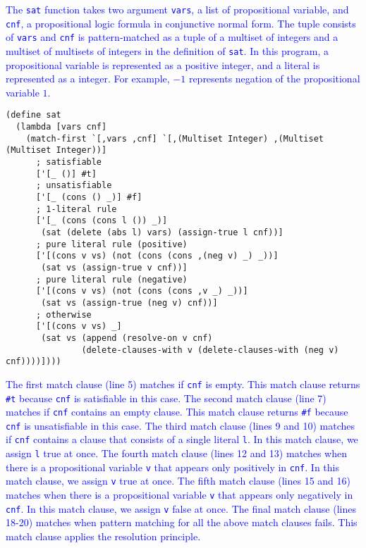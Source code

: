 \documentclass[acmlarge]{acmart}
\newcommand{\new}[1]{\textcolor{blue}{#1}}
\begin{document}
\new{
The \lstinline{sat} function takes two argument \lstinline{vars}, a list of propositional variable, and \lstinline{cnf}, a propositional logic formula in conjunctive normal form.
The tuple consists of \lstinline{vars} and \lstinline{cnf} is pattern-matched as a tuple of a multiset of integers and a multiset of multisets of integers in the definition of \lstinline{sat}.
In this program, a propositional variable is represented as a positive integer, and a literal is represented as a integer.
For example, $-1$ represents negation of the propositional variable $1$.
}%

\begin{lstlisting}[language=egison]
(define sat
  (lambda [vars cnf]
    (match-first `[,vars ,cnf] `[,(Multiset Integer) ,(Multiset (Multiset Integer))]
      ; satisfiable
      ['[_ ()] #t]
      ; unsatisfiable
      ['[_ (cons () _)] #f]
      ; 1-literal rule
      ['[_ (cons (cons l ()) _)]
       (sat (delete (abs l) vars) (assign-true l cnf))]
      ; pure literal rule (positive)
      ['[(cons v vs) (not (cons (cons ,(neg v) _) _))]
       (sat vs (assign-true v cnf))]
      ; pure literal rule (negative)
      ['[(cons v vs) (not (cons (cons ,v _) _))]
       (sat vs (assign-true (neg v) cnf))]
      ; otherwise
      ['[(cons v vs) _]
       (sat vs (append (resolve-on v cnf)
               (delete-clauses-with v (delete-clauses-with (neg v) cnf))))])))
\end{lstlisting}

\noindent
\new{
The first match clause (line 5) matches if \lstinline{cnf} is empty.
This match clause returns \lstinline{#t} because \lstinline{cnf} is satisfiable in this case.
The second match clause (line 7) matches if \lstinline{cnf} contains an empty clause.
This match clause returns \lstinline{#f} because \lstinline{cnf} is unsatisfiable in this case.
The third match clause (lines 9 and 10) matches if \lstinline{cnf} contains a clause that consists of a single literal \lstinline{l}.
In this match clause, we assign \lstinline{l} true at once.
The fourth match clause (lines 12 and 13) matches when there is a propositional variable \lstinline{v} that appears only positively in \lstinline{cnf}.
In this match clause, we assign \lstinline{v} true at once.
The fifth match clause (lines 15 and 16) matches when there is a propositional variable \lstinline{v} that appears only negatively in \lstinline{cnf}.
In this match clause, we assign \lstinline{v} false at once.
The final match clause (lines 18-20) matches when pattern matching for all the above match clauses fails.
This match clause applies the resolution principle.
}%
\end{document}
